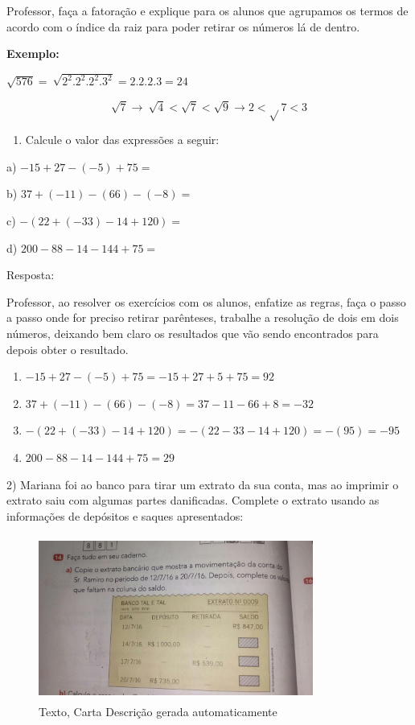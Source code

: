 Professor, faça a fatoração e explique para os alunos que agrupamos os
termos de acordo com o índice da raiz para poder retirar os números lá
de dentro.

\textbf{Exemplo:}

\(\sqrt{576} = \ \sqrt{2^{2}.2^{2}.2^{2}.3^2} = 2.2.2.3 = 24\)

\[\sqrt{7} \rightarrow \ \sqrt{4} < \sqrt{7} < \sqrt{9} \rightarrow 2 < \sqrt{}7 < 3\]



\begin{enumerate}
\def\labelenumi{\arabic{enumi})}
\tightlist
\item
  Calcule o valor das expressões a seguir:
\end{enumerate}

a) \(- 15 + 27 - \left( - 5 \right) + 75 =\)

b) \(37 + \left( - 11 \right) - \left( 66 \right) - ( - 8) =\)

c) \(- (22 + \left( - 33 \right) - 14 + 120) =\)

d) \(200 - 88 - 14 - 144 + 75 =\)

Resposta:

Professor, ao resolver os exercícios com os alunos, enfatize as regras,
faça o passo a passo onde for preciso retirar parênteses, trabalhe a
resolução de dois em dois números, deixando bem claro os resultados que
vão sendo encontrados para depois obter o resultado.

\begin{enumerate}
\def\labelenumi{\alph{enumi})}
\item
  \(- 15 + 27 - \left( - 5 \right) + 75 = - 15 + 27 + 5 + 75 = 92\)
\item
  \(37 + \left( - 11 \right) - \left( 66 \right) - \left( - 8 \right) = 37 - 11 - 66 + 8 = - 32\)
\item
  \(- \left( 22 + \left( - 33 \right) - 14 + 120 \right) = - \left( 22 - 33 - 14 + 120 \right) = - \left( 95 \right) = - 95\)
\item
  \(200 - 88 - 14 - 144 + 75 = 29\)
\end{enumerate}

2) Mariana foi ao banco para tirar um extrato da sua conta, mas ao
imprimir o extrato saiu com algumas partes danificadas. Complete o
extrato usando as informações de depósitos e saques apresentados:

\begin{figure}
\centering
\includegraphics[width=3.54698in,height=2.14059in]{./imgSAEB_7_MAT/media/image2.jpg}
\caption{Texto, Carta Descrição gerada automaticamente}
\end{figure}


